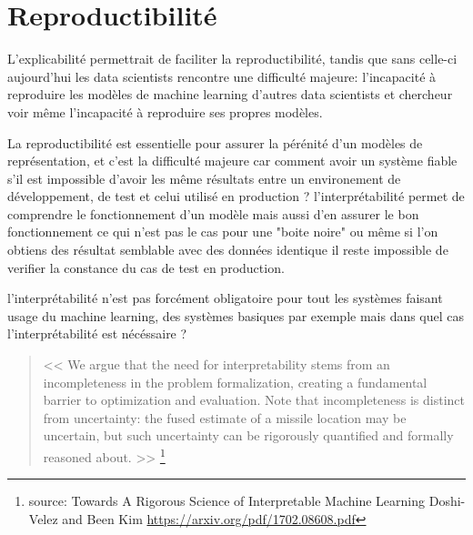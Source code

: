         \section{Reproductibilité}
        L'explicabilité permettrait de faciliter la reproductibilité, tandis que sans celle-ci 
        aujourd'hui les data scientists rencontre une difficulté majeure: 
        l'incapacité à reproduire les modèles de machine learning d'autres data scientists 
        et chercheur voir même l'incapacité à reproduire ses propres modèles. \newline 
        
        La reproductibilité est essentielle pour assurer la pérénité d'un modèles de représentation, 
        et c'est la difficulté majeure car comment avoir un système fiable s'il est impossible 
        d'avoir les même résultats entre un environement de développement, de test et celui 
        utilisé en production ? l'interprétabilité permet de comprendre le fonctionnement 
        d'un modèle mais aussi d'en assurer le bon fonctionnement ce qui n'est pas le cas 
        pour une "boite noire" ou même si l'on obtiens des résultat semblable avec des données 
        identique il reste impossible de verifier la constance du cas de test en production. 
        \newline

        l'interprétabilité n'est pas forcément obligatoire pour tout les systèmes 
        faisant usage du machine learning, des systèmes basiques par exemple 
        mais dans quel cas l'interprétabilité est nécéssaire ?  \newline

        \begin{quote}
            << We argue that the need for interpretability
            stems from an incompleteness in the problem formalization, creating a fundamental barrier to
            optimization and evaluation. Note that incompleteness is distinct from uncertainty: the fused
            estimate of a missile location may be uncertain, but such uncertainty can be rigorously quantified
            and formally reasoned about. >>
            \footnote{source: Towards A Rigorous Science of Interpretable Machine Learning \newline
            Doshi-Velez and Been Kim \newline
            \url{https://arxiv.org/pdf/1702.08608.pdf}}
            \newline
        \end{quote}



